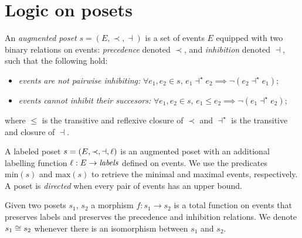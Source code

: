 \section{Logic on posets}
\label{sec:posets}



\begin{definition}
  \label{def:poset}
  An \emph{augmented poset} $s=(E,\prec,\dashv)$ is a set of events $E$ equipped with two binary relations on events: \emph{precedence} denoted $\prec$, and \emph{inhibition} denoted $\dashv$, such that the following hold:
  \begin{itemize}
  \item \emph{events are not pairwise inhibiting:}
    $\forall e_1,e_2\in s$, $e_1\dashv^{\star} e_2\implies \neg(e_2 \dashv^{\star} e_1)$;
  \item \emph{events cannot inhibit their succesors:}
    $\forall e_1,e_2\in s$, $e_1\leq e_2\implies \neg(e_1 \dashv^{\star} e_2)$;
  \end{itemize}
  where $\leq$ is the transitive and reflexive closure of $\prec$ and $\dashv^{\star}$ is the transitive and closure of $\dashv$.

  A labeled poset $s=(E,\prec,\dashv,\ell)$ is an augmented poset with an additional labelling function $\ell:E\to \textit{labels}$ defined on events.
  We use the predicates $\text{min}(s)$ and $\text{max}(s)$ to retrieve the minimal and maximal events, respectively.
  A poset is \emph{directed} when every pair of events has an upper bound.
\end{definition}

\begin{definition}
  Given two posets $s_1$, $s_2$ a morphism $f:s_1\to s_2$ is a total function on events that preserves labels and preserves the precedence and inhibition relations. We denote $s_1\cong s_2$ whenever there is an isomorphism between $s_1$ and $s_2$.
\end{definition}

